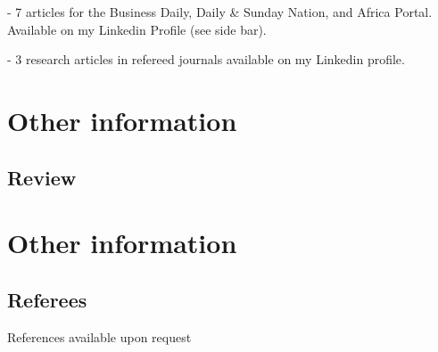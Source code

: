 \documentclass[letterpaper]{twentysecondcv} %
\begin{document}
- 7 articles for the Business Daily, Daily \& Sunday Nation, and Africa Portal. Available on my Linkedin Profile (see side bar). 

- 3 research articles in refereed journals available on my Linkedin profile. 


\newpage %


\section{Other information}

\subsection{Review}

\section{Other information}

\subsection{Referees}

References available upon request

\end{document}
